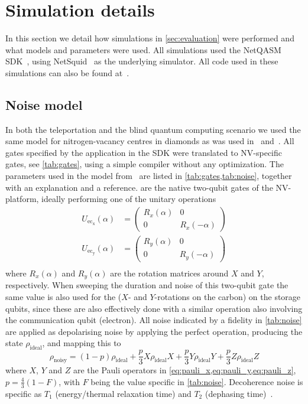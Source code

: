 \section{Simulation details}
\label{app:simulation}

In this section we detail how simulations in \cref{sec:evaluation} were
performed and what models and parameters were used. All simulations used the
\ac{NetQASM} SDK~\cite{git_netqasm}, using
NetSquid~\cite{netsquid,coopmans2021netsquid} as the underlying simulator. All
code used in these simulations can also be found at~\cite{git_squidasm}.


\subsection{Noise model}
In both the teleportation and the blind quantum computing scenario we used the
same model for nitrogen-vacancy centres in diamonds as was used
in~\cite{dahlberg2019linklayer} and~\cite{coopmans2021netsquid}. All gates
specified by the application in the SDK were translated to NV-specific gates,
see \cref{tab:gates}, using a simple compiler without any optimization. The
parameters used in the model from~\cite{dahlberg2019linklayer} are listed in
\cref{tab:gates,tab:noise}, together with an explanation and a reference.
 are the native two-qubit gates of the NV-platform,
ideally performing one of the unitary operations
\begin{align}
  U_\mathrm{ec_x}(\alpha) & = \begin{pmatrix}R_x(\alpha) & 0 \\ 0 & R_x(-\alpha) \end{pmatrix} \label{eq:crot_x} \\
  U_\mathrm{ec_y}(\alpha) & = \begin{pmatrix}R_y(\alpha) & 0 \\ 0 & R_y(-\alpha) \end{pmatrix} \label{eq:crot_y} \\
\end{align}
where $R_x(\alpha)$ and $R_y(\alpha)$ are the rotation matrices around $X$ and
$Y$, respectively. When sweeping the duration and noise of this two-qubit gate
the same value is also used for the  ($X$- and $Y$-rotations
on the carbon) on the storage qubits, since these are also effectively done with
a similar operation also involving the communication qubit (electron). All noise
indicated by a fidelity in \cref{tab:noise} are applied as depolarising noise by
applying the perfect operation, producing the state $\rho_\mathrm{ideal}$, and
mapping this to
\begin{equation}\label{eq:depolarising}
  \rho_\mathrm{noisy}=(1-p)\rho_\mathrm{ideal} + \frac{p}{3}X\rho_\mathrm{ideal}X + \frac{p}{3}Y\rho_\mathrm{ideal}Y + \frac{p}{3}Z\rho_\mathrm{ideal}Z
\end{equation}
where $X$, $Y$ and $Z$ are the Pauli operators in
\cref{eq:pauli_x,eq:pauli_y,eq:pauli_z}, $p=\frac{4}{3}(1 - F)$, with $F$ being
the value specific in \cref{tab:noise}. Decoherence noise is specific as $T_1$
(energy/thermal relaxation time) and $T_2$ (dephasing time)~\cite{Nielsen2010}.

